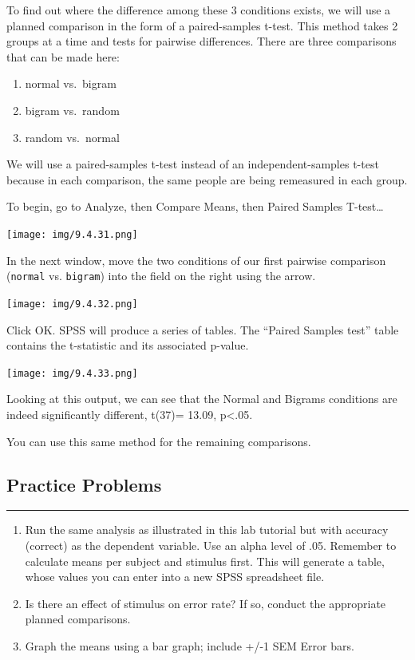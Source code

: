 \documentclass[]{book}
\providecommand{\tightlist}{%
  \setlength{\itemsep}{0pt}\setlength{\parskip}{0pt}}
\begin{document}
To find out where the difference among these 3 conditions exists, we
will use a planned comparison in the form of a paired-samples t-test.
This method takes 2 groups at a time and tests for pairwise differences.
There are three comparisons that can be made here:

\begin{enumerate}
\def\labelenumi{\arabic{enumi}.}
\tightlist
\item
  normal vs.~bigram
\item
  bigram vs.~random
\item
  random vs.~normal
\end{enumerate}

We will use a paired-samples t-test instead of an independent-samples
t-test because in each comparison, the same people are being remeasured
in each group.

To begin, go to {Analyze}, then {Compare Means}, then {Paired Samples
T-test\ldots{}}

\texttt{[image: img/9.4.31.png]}

In the next window, move the two conditions of our first pairwise
comparison (\texttt{normal} vs. \texttt{bigram}) into the field on the
right using the arrow.

\texttt{[image: img/9.4.32.png]}

Click {OK}. SPSS will produce a series of tables. The ``Paired Samples
test'' table contains the t-statistic and its associated p-value.

\texttt{[image: img/9.4.33.png]}

Looking at this output, we can see that the Normal and Bigrams
conditions are indeed significantly different, t(37)= 13.09,
p\textless{}.05.

You can use this same method for the remaining comparisons.

\subsection{Practice Problems}\label{practice-problems-8}

\begin{center}\rule{0.5\linewidth}{0.5pt}\end{center}

\begin{enumerate}
\def\labelenumi{\arabic{enumi}.}
\item
  Run the same analysis as illustrated in this lab tutorial but with
  accuracy (correct) as the dependent variable. Use an alpha level of
  .05. Remember to calculate means per subject and stimulus first. This
  will generate a table, whose values you can enter into a new SPSS
  spreadsheet file.
\item
  Is there an effect of stimulus on error rate? If so, conduct the
  appropriate planned comparisons.
\item
  Graph the means using a bar graph; include +/-1 SEM Error bars.
\end{enumerate}
\end{document}
